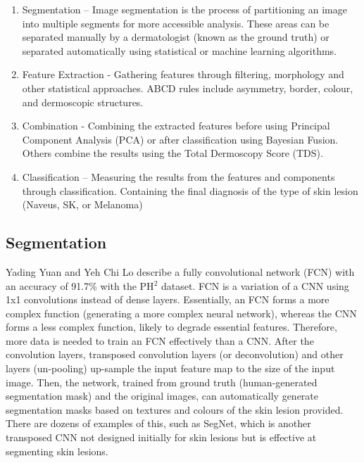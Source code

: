 \begin{enumerate}

	\item Segmentation – Image segmentation is the process of partitioning an image into multiple segments for more accessible analysis. These areas can be separated manually by a dermatologist (known as the ground truth) or separated automatically using statistical or machine learning algorithms.

	\item Feature Extraction - Gathering features through filtering, morphology and other statistical approaches. ABCD rules include asymmetry, border, colour, and dermoscopic structures.

	\item Combination - Combining the extracted features before using Principal Component Analysis (PCA) or after classification using Bayesian Fusion. Others combine the results using the Total Dermoscopy Score (TDS).

	\item Classification – Measuring the results from the features and components through classification. Containing the final diagnosis of the type of skin lesion (Naveus, SK, or Melanoma)

\end{enumerate}

\subsection{Segmentation}
Yading Yuan and Yeh Chi Lo describe a fully convolutional network (FCN) with an accuracy of 91.7\% with the PH$^2$ dataset\cite{Yuan2017a}. FCN is a variation of a CNN using 1x1 convolutions instead of dense layers. Essentially, an FCN forms a more complex function (generating a more complex neural network), whereas the CNN forms a less complex function, likely to degrade essential features. Therefore, more data is needed to train an FCN effectively than a CNN. After the convolution layers, transposed convolution layers (or deconvolution) and other layers (un-pooling) up-sample the input feature map to the size of the input image. Then, the network, trained from ground truth (human-generated segmentation mask) and the original images, can automatically generate segmentation masks based on textures and colours of the skin lesion provided. There are dozens of examples of this, such as SegNet\cite{Badrinarayanan2017}, which is another transposed CNN not designed initially for skin lesions but is effective at segmenting skin lesions.

